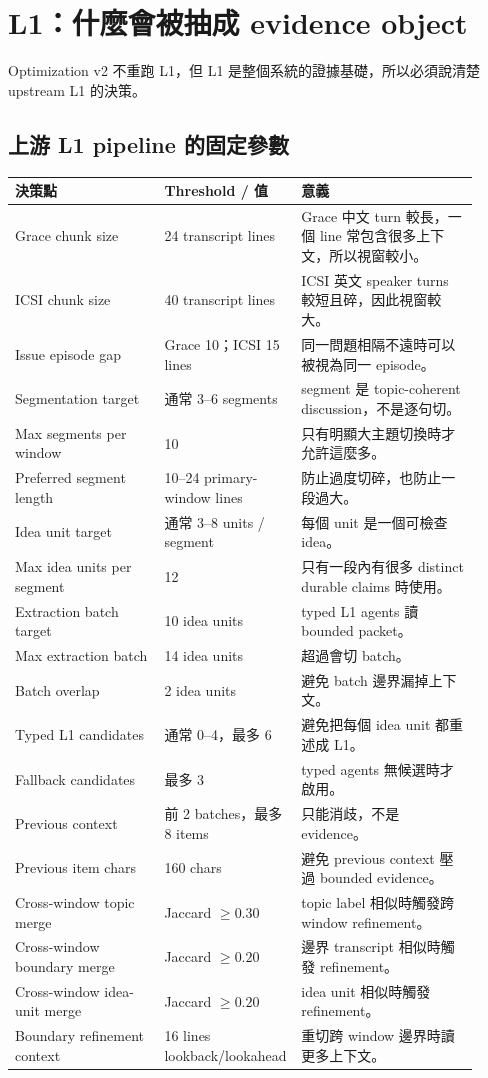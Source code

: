 \documentclass[11pt]{article}
\begin{document}
\section{L1：什麼會被抽成 evidence object}

Optimization v2 不重跑 L1，但 L1 是整個系統的證據基礎，所以必須說清楚 upstream L1 的決策。

\subsection{上游 L1 pipeline 的固定參數}

\begin{longtable}{p{0.32\linewidth}p{0.22\linewidth}p{0.38\linewidth}}
\toprule
\textbf{決策點} & \textbf{Threshold / 值} & \textbf{意義}\\
\midrule
Grace chunk size & 24 transcript lines & Grace 中文 turn 較長，一個 line 常包含很多上下文，所以視窗較小。\\
ICSI chunk size & 40 transcript lines & ICSI 英文 speaker turns 較短且碎，因此視窗較大。\\
Issue episode gap & Grace 10；ICSI 15 lines & 同一問題相隔不遠時可以被視為同一 episode。\\
Segmentation target & 通常 3--6 segments & segment 是 topic-coherent discussion，不是逐句切。\\
Max segments per window & 10 & 只有明顯大主題切換時才允許這麼多。\\
Preferred segment length & 10--24 primary-window lines & 防止過度切碎，也防止一段過大。\\
Idea unit target & 通常 3--8 units / segment & 每個 unit 是一個可檢查 idea。\\
Max idea units per segment & 12 & 只有一段內有很多 distinct durable claims 時使用。\\
Extraction batch target & 10 idea units & typed L1 agents 讀 bounded packet。\\
Max extraction batch & 14 idea units & 超過會切 batch。\\
Batch overlap & 2 idea units & 避免 batch 邊界漏掉上下文。\\
Typed L1 candidates & 通常 0--4，最多 6 & 避免把每個 idea unit 都重述成 L1。\\
Fallback candidates & 最多 3 & typed agents 無候選時才啟用。\\
Previous context & 前 2 batches，最多 8 items & 只能消歧，不是 evidence。\\
Previous item chars & 160 chars & 避免 previous context 壓過 bounded evidence。\\
Cross-window topic merge & Jaccard $\geq 0.30$ & topic label 相似時觸發跨 window refinement。\\
Cross-window boundary merge & Jaccard $\geq 0.20$ & 邊界 transcript 相似時觸發 refinement。\\
Cross-window idea-unit merge & Jaccard $\geq 0.20$ & idea unit 相似時觸發 refinement。\\
Boundary refinement context & 16 lines lookback/lookahead & 重切跨 window 邊界時讀更多上下文。\\
\bottomrule
\end{longtable}
\end{document}
